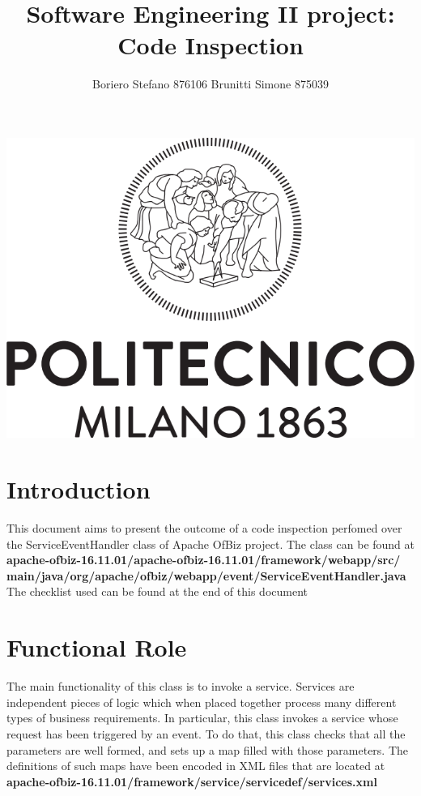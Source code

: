 \documentclass{article}
\begin{document}
\title{\textbf{{\Huge Software Engineering II project: Code Inspection}}}
\author{\begin{large}
Boriero Stefano  876106  
Brunitti Simone   875039
\end{large} }

\maketitle
\includegraphics[scale=0.5]{Logo_Politecnico_Milano.png} 
\newpage
\tableofcontents
\section{Introduction}
This document aims to present the outcome of a code inspection perfomed over the ServiceEventHandler class of Apache OfBiz project. The class can be found at\\
\textbf{apache-ofbiz-16.11.01/apache-ofbiz-16.11.01/framework/webapp/src/}\\
\textbf{main/java/org/apache/ofbiz/webapp/event/ServiceEventHandler.java}\\

The checklist used can be found at the end of this document

\section{Functional Role}
The main functionality of this class is to invoke a service. Services are independent pieces of logic which when placed together process many different types of business requirements. In particular, this class invokes a service whose request has been triggered by an event. To do that, this class checks that all the parameters are well formed, and sets up a map filled with those parameters. The definitions of such maps have been encoded in XML files that are located at\\
\textbf{apache-ofbiz-16.11.01/framework/service/servicedef/services.xml}\\
\end{document}
